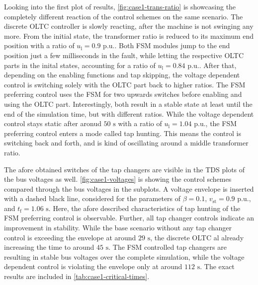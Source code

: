 Looking into the first plot of results, \autoref{fig:case1-trans-ratio} is showcasing the completely different reaction of the control schemes on the same scenario.
The discrete \acs{OLTC} controller is slowly reacting, after the machine is not swinging any more.
From the initial state, the transformer ratio is reduced to its maximum end position with a ratio of $u_\mathrm{l}=0.9\text{ p.u.}$.
Both \acs{FSM} modules jump to the end position just a few milliseconds in the fault, while letting the respective \acs{OLTC} parts in the inital states, accounting for a ratio of $u_\mathrm{l}=0.84\text{ p.u.}$.
After that, depending on the enabling functions and tap skipping, the voltage dependent control is switching solely with the \acs{OLTC} part back to higher ratios.
The \acs{FSM} preferring control uses the \acs{FSM} for two upwards switches before enabling and using the \acs{OLTC} part.
Interestingly, both result in a stable state at least until the end of the simulation time, but with different ratios.
While the voltage dependent control stays static after aronud $50\text{ s}$ with a ratio of $u_\mathrm{l}=1.04\text{ p.u.}$, the \acs{FSM} preferring control enters a mode called tap hunting.
This means the control is switching back and forth, and is kind of oscillating around a middle transformer ratio.

The afore obtained switches of the tap changers are visible in the \acs{TDS} plots of the bus voltages as well.
\autoref{fig:case1-voltages} is showing the control schemes compared through the bus voltages in the subplots.
A voltage envelope is inserted with a dashed black line, considered for the parameters of $\beta=0.1$,  $v_\mathrm{st}=0.9\text{ p.u.}$, and $t_\mathrm{f}=1.06\text{ s}$.
Here, the afore described characteristics of tap hunting of the \acs{FSM} preferring control is observable.
Further, all tap changer controls indicate an improvement in stability.
While the base scenario without any tap changer control is exceeding the envelope at around $29\text{ s}$, the discrete \acs{OLTC} al already increasing the time to around $45\text{ s}$. 
The \acs{FSM} controlled tap changers are resulting in stable bus voltages over the complete simulation, while the voltage dependent control is violating the envelope only at around $112\text{ s}$.
The exact results are included in \autoref{tab:case1-critical-times}.

